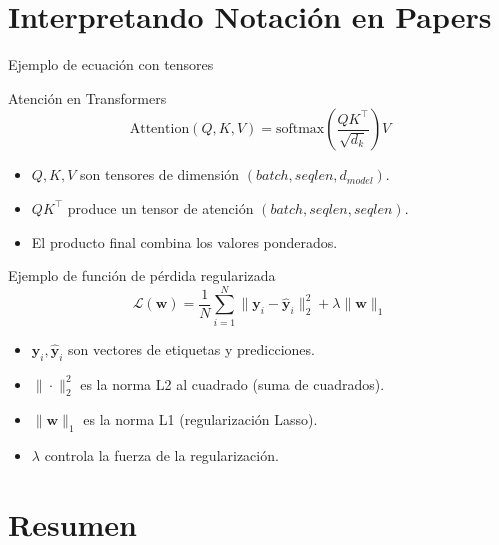 \documentclass[aspectratio=169, 10pt, xcolor=table]{beamer}
\begin{document}
\section{Interpretando Notación en Papers}

\begin{frame}{Ejemplo de ecuación con tensores}
    \begin{block}{Atención en Transformers}
        \[
        \text{Attention}(Q, K, V) = \text{softmax}\left(\frac{QK^\top}{\sqrt{d_k}}\right)V
        \]
    \end{block}
    \begin{itemize}
        \item $Q, K, V$ son tensores de dimensión $(batch, seqlen, d_{model})$.
        \item $QK^\top$ produce un tensor de atención $(batch, seqlen, seqlen)$.
        \item El producto final combina los valores ponderados.
    \end{itemize}
\end{frame}

\begin{frame}{Ejemplo de función de pérdida regularizada}
    \[
    \mathcal{L}(\mathbf{w}) = \frac{1}{N}\sum_{i=1}^{N} \|\mathbf{y}_i - \hat{\mathbf{y}}_i\|_2^2 + \lambda \|\mathbf{w}\|_1
    \]
    \begin{itemize}
        \item $\mathbf{y}_i, \hat{\mathbf{y}}_i$ son vectores de etiquetas y predicciones.
        \item $\|\cdot\|_2^2$ es la norma L2 al cuadrado (suma de cuadrados).
        \item $\|\mathbf{w}\|_1$ es la norma L1 (regularización Lasso).
        \item $\lambda$ controla la fuerza de la regularización.
    \end{itemize}
\end{frame}

\section{Resumen}
\end{document}
